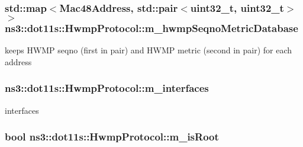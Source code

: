 \subsubsection[{\texorpdfstring{m\+\_\+hwmp\+Seqno\+Metric\+Database}{m_hwmpSeqnoMetricDatabase}}]{\setlength{\rightskip}{0pt plus 5cm}std\+::map$<${\bf Mac48\+Address}, std\+::pair$<$uint32\+\_\+t, uint32\+\_\+t$>$ $>$ ns3\+::dot11s\+::\+Hwmp\+Protocol\+::m\+\_\+hwmp\+Seqno\+Metric\+Database\hspace{0.3cm}{\ttfamily [private]}}\hypertarget{classns3_1_1dot11s_1_1HwmpProtocol_afcff65dd692f7524ea04f46d2cfc7990}{}\label{classns3_1_1dot11s_1_1HwmpProtocol_afcff65dd692f7524ea04f46d2cfc7990}


keeps H\+W\+MP seqno (first in pair) and H\+W\+MP metric (second in pair) for each address 

\subsubsection[{\texorpdfstring{m\+\_\+interfaces}{m_interfaces}}]{ ns3\+::dot11s\+::\+Hwmp\+Protocol\+::m\+\_\+interfaces\hspace{0.3cm}{\ttfamily [private]}}\hypertarget{classns3_1_1dot11s_1_1HwmpProtocol_ae2cee085d1d2b9d32b509b710c0b4511}{}\label{classns3_1_1dot11s_1_1HwmpProtocol_ae2cee085d1d2b9d32b509b710c0b4511}


interfaces 

\subsubsection[{\texorpdfstring{m\+\_\+is\+Root}{m_isRoot}}]{\setlength{\rightskip}{0pt plus 5cm}bool ns3\+::dot11s\+::\+Hwmp\+Protocol\+::m\+\_\+is\+Root\hspace{0.3cm}{\ttfamily [private]}}\hypertarget{classns3_1_1dot11s_1_1HwmpProtocol_a4664b89c3ad6d74c0010e64c2ac1dc03}{}\label{classns3_1_1dot11s_1_1HwmpProtocol_a4664b89c3ad6d74c0010e64c2ac1dc03}

